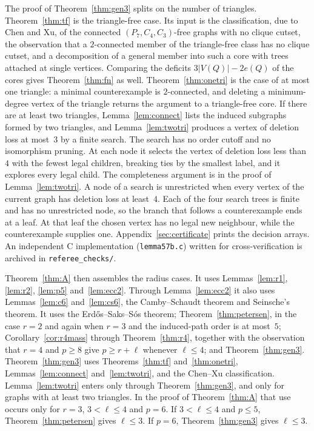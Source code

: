 \documentclass[ASNA]{USG}
\theoremstyle{WBstyletwo}
\numberwithin{equation}{section}
\newcommand{\lr}{\ell}
\newcommand{\pp}{p}
\begin{document}
The proof of Theorem~\ref{thm:gen3} splits on the number of triangles. Theorem~\ref{thm:tf} is the triangle-free case. Its input is the classification, due to Chen and Xu, of the connected $(P_7,C_4,C_3)$-free graphs with no clique cutset, the observation that a $2$-connected member of the triangle-free class has no clique cutset, and a decomposition of a general member into such a core with trees attached at single vertices. Comparing the deficits $3|V(Q)|-2e(Q)$ of the cores gives Theorem~\ref{thm:fn} as well. Theorem~\ref{thm:onetri} is the case of at most one triangle: a minimal counterexample is $2$-connected, and deleting a minimum-degree vertex of the triangle returns the argument to a triangle-free core. If there are at least two triangles, Lemma~\ref{lem:connect} lists the induced subgraphs formed by two triangles, and Lemma~\ref{lem:twotri} produces a vertex of deletion loss at most~$3$ by a finite search. The search has no order cutoff and no isomorphism pruning. At each node it selects the vertex of deletion loss less than~$4$ with the fewest legal children, breaking ties by the smallest label, and it explores every legal child. The completeness argument is in the proof of Lemma~\ref{lem:twotri}. A node of a search is unrestricted when every vertex of the current graph has deletion loss at least~$4$. Each of the four search trees is finite and has no unrestricted node, so the branch that follows a counterexample ends at a leaf. At that leaf the chosen vertex has no legal new neighbour, while the counterexample supplies one. Appendix~\ref{sec:certificate} prints the decision arrays. An independent C implementation (\texttt{lemma57b.c}) written for cross-verification is archived in \texttt{referee\_checks/}.

Theorem~\ref{thm:A} then assembles the radius cases. It uses Lemmas~\ref{lem:r1}, \ref{lem:r2}, \ref{lem:p5} and~\ref{lem:ecc2}. Through Lemma~\ref{lem:ecc2} it also uses Lemmas~\ref{lem:c6} and~\ref{lem:cs6}, the Camby--Schaudt theorem and Seinsche's theorem. It uses the Erd\H{o}s--Saks--S\'os theorem; Theorem~\ref{thm:petersen}, in the case $r=2$ and again when $r=3$ and the induced-path order is at most~$5$; Corollary~\ref{cor:r4mass} through Theorem~\ref{thm:r4}, together with the observation that $r=4$ and $\pp\ge 8$ give $\pp\ge r+\lr$ whenever $\lr\le 4$; and Theorem~\ref{thm:gen3}. Theorem~\ref{thm:gen3} uses Theorems~\ref{thm:tf} and~\ref{thm:onetri}, Lemmas~\ref{lem:connect} and~\ref{lem:twotri}, and the Chen--Xu classification. Lemma~\ref{lem:twotri} enters only through Theorem~\ref{thm:gen3}, and only for graphs with at least two triangles. In the proof of Theorem~\ref{thm:A} that use occurs only for $r=3$, $3<\lr\le 4$ and $\pp=6$. If $3<\lr\le 4$ and $\pp\le 5$, Theorem~\ref{thm:petersen} gives $\lr\le 3$. If $\pp=6$, Theorem~\ref{thm:gen3} gives $\lr\le 3$.
\end{document}
